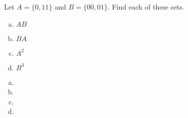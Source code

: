 \documentclass[../main.tex]{subfiles}
\begin{document}
Let $A = \{0, 11\}$ and $B = \{00, 01\}$.
Find each of these sets.
\begin{enumerate}[a)]
	\item $AB$
	\item $BA$
	\item $A^2$
	\item $B^3$
\end{enumerate}

\solution
\begin{enumerate}[a)]
	\item 
	\item 
	\item 
	\item 
\end{enumerate}
\end{document}
